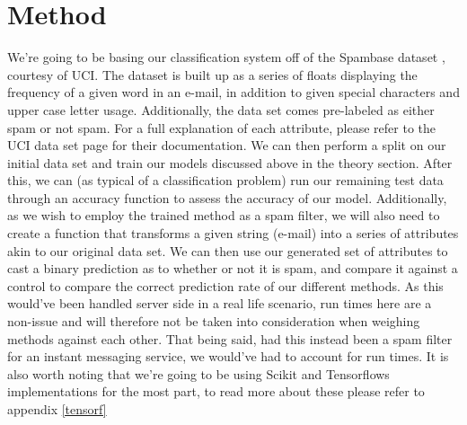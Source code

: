 \documentclass{article}
\begin{document}
\section{Method}
We're going to be basing our classification system off of the Spambase dataset \cite{data}, courtesy of UCI. The dataset is built up as a series of floats displaying the frequency of a given word in an e-mail, in addition to given special characters and upper case letter usage. Additionally, the data set comes pre-labeled as either spam or not spam. For a full explanation of each attribute, please refer to the UCI data set page for their documentation.\newline
We can then perform a split on our initial data set and train our models discussed above in the theory section. After this, we can (as typical of a classification problem) run our remaining test data through an accuracy function to assess the accuracy of our model. \newline
Additionally, as we wish to employ the trained method as a spam filter, we will also need to create a function that transforms a given string (e-mail) into a series of attributes akin to our original data set. We can then use our generated set of attributes to cast a binary prediction as to whether or not it is spam, and compare it against a control to compare the correct prediction rate of our different methods. \newline
As this would've been handled server side in a real life scenario, run times here are a non-issue and will therefore not be taken into consideration when weighing methods against each other. That being said, had this instead been a spam filter for an instant messaging service, we would've had to account for run times. \newline
It is also worth noting that we're going to be using Scikit and Tensorflows implementations for the most part, to read more about these please refer to appendix \ref{tensorf}
\end{document}
